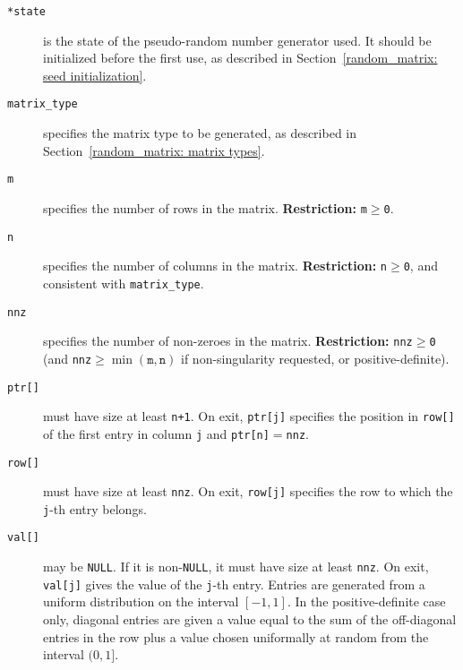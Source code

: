 \begin{description}

\item[\texttt{*state}] is the state of the pseudo-random number generator used.
   It should be initialized before the first use, as described in
   Section~\ref{random_matrix: seed initialization}.

\item[\texttt{matrix\_type}] specifies the matrix type to be generated, as
   described in Section~\ref{random_matrix: matrix types}.

\item[\texttt{m}] specifies the number of rows in the matrix.
{\bf Restriction:} {\tt m$\geq$0}.

\item[\texttt{n}] specifies the number of columns in the matrix.
{\bf Restriction:} {\tt n$\geq$0}, and consistent with \texttt{matrix\_type}.

\item[\texttt{nnz}] specifies the number of non-zeroes in the matrix.
{\bf Restriction:} {\tt nnz$\geq$0} (and \texttt{nnz}$\geq\min(\texttt{m},\texttt{n})$ if non-singularity requested, or positive-definite).

\item[\texttt{ptr[]}] must have size at least {\tt n+1}. On exit, {\tt ptr[j]}
   specifies the position in {\tt row[]}
   of the first entry in column {\tt j} and {\tt ptr[n]$=$nnz}.

\item[\texttt{row[]}] must have size at least {\tt nnz}. On exit, {\tt row[j]}
   specifies the row to which the {\tt j}-th entry belongs.

\item[\texttt{val[]}] may be \texttt{NULL}. If it is non-\texttt{NULL}, it must
   have size at least \texttt{nnz}. On exit, \texttt{val[j]} gives
   the value of the \texttt{j}-th entry. Entries are generated from a uniform
   distribution on the interval $[-1,1]$. In the positive-definite case only,
   diagonal entries are given a value equal to the sum of the off-diagonal
   entries in the row plus a value chosen uniformally at random from the
   interval $(0,1]$.


\end{description}
